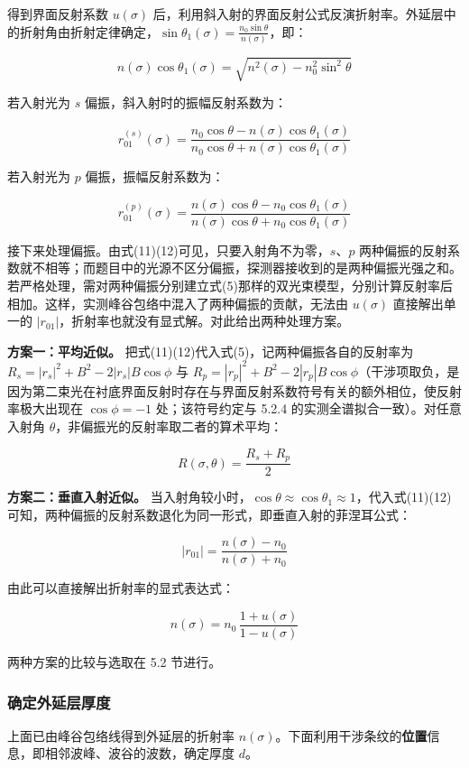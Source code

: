 得到界面反射系数 $u(\sigma)$ 后，利用斜入射的界面反射公式反演折射率。外延层中的折射角由折射定律确定，$\sin\theta_1(\sigma)=\frac{n_0\sin\theta}{n(\sigma)}$，即：

\[
n(\sigma)\cos\theta_1(\sigma)=\sqrt{n^2(\sigma)-n_0^2\sin^2\theta} \tag{10}
\]

若入射光为 $s$ 偏振，斜入射时的振幅反射系数为：

\[
r_{01}^{(s)}(\sigma)=
\frac{n_0\cos\theta-n(\sigma)\cos\theta_1(\sigma)}
{n_0\cos\theta+n(\sigma)\cos\theta_1(\sigma)} \tag{11}
\]

若入射光为 $p$ 偏振，振幅反射系数为：

\[
r_{01}^{(p)}(\sigma)=
\frac{n(\sigma)\cos\theta-n_0\cos\theta_1(\sigma)}
{n(\sigma)\cos\theta+n_0\cos\theta_1(\sigma)} \tag{12}
\]

接下来处理偏振。由式(11)(12)可见，只要入射角不为零，$s$、$p$ 两种偏振的反射系数就不相等；而题目中的光源不区分偏振，探测器接收到的是两种偏振光强之和。若严格处理，需对两种偏振分别建立式(5)那样的双光束模型，分别计算反射率后相加。这样，实测峰谷包络中混入了两种偏振的贡献，无法由 $u(\sigma)$ 直接解出单一的 $|r_{01}|$，折射率也就没有显式解。对此给出两种处理方案。


{\textbf{方案一：平均近似。}} 把式(11)(12)代入式(5)，记两种偏振各自的反射率为 $R_s=|r_s|^2+B^2-2|r_s|B\cos\phi$ 与 $R_p=|r_p|^2+B^2-2|r_p|B\cos\phi$（干涉项取负，是因为第二束光在衬底界面反射时存在与界面反射系数符号有关的额外相位，使反射率极大出现在 $\cos\phi=-1$ 处；该符号约定与 5.2.4 的实测全谱拟合一致）。对任意入射角 $\theta$，非偏振光的反射率取二者的算术平均：

\[
R(\sigma,\theta)=\frac{R_s+R_p}{2} \tag{13}
\]

{\textbf{方案二：垂直入射近似。}} 当入射角较小时，$\cos\theta\approx\cos\theta_1\approx1$，代入式(11)(12)可知，两种偏振的反射系数退化为同一形式，即垂直入射的菲涅耳公式：

\[
|r_{01}|=\frac{n(\sigma)-n_0}{n(\sigma)+n_0} \tag{14}
\]

由此可以直接解出折射率的显式表达式：

\[
n(\sigma)=n_0\,\frac{1+u(\sigma)}{1-u(\sigma)} \tag{15}
\]

两种方案的比较与选取在 5.2 节进行。

\subsubsection{确定外延层厚度}

上面已由峰谷包络线得到外延层的折射率 $n(\sigma)$。下面利用干涉条纹的{\textbf{位置}}信息，即相邻波峰、波谷的波数，确定厚度 $d$。


